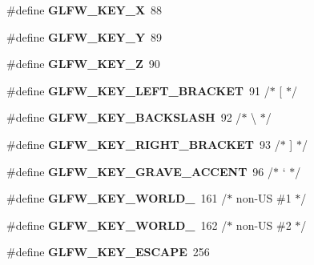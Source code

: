\begin{DoxyCompactItemize}
\#define {\bfseries G\+L\+F\+W\+\_\+\+K\+E\+Y\+\_\+X}~88
\item 
\mbox{\label{group__keys_gafd9f115a549effdf8e372a787c360313}} 
\#define {\bfseries G\+L\+F\+W\+\_\+\+K\+E\+Y\+\_\+Y}~89
\item 
\mbox{\label{group__keys_gac489e208c26afda8d4938ed88718760a}} 
\#define {\bfseries G\+L\+F\+W\+\_\+\+K\+E\+Y\+\_\+Z}~90
\item 
\mbox{\label{group__keys_gad1c8d9adac53925276ecb1d592511d8a}} 
\#define {\bfseries G\+L\+F\+W\+\_\+\+K\+E\+Y\+\_\+\+L\+E\+F\+T\+\_\+\+B\+R\+A\+C\+K\+ET}~91  /$\ast$ \mbox{[} $\ast$/
\item 
\mbox{\label{group__keys_gab8155ea99d1ab27ff56f24f8dc73f8d1}} 
\#define {\bfseries G\+L\+F\+W\+\_\+\+K\+E\+Y\+\_\+\+B\+A\+C\+K\+S\+L\+A\+SH}~92  /$\ast$ \textbackslash{} $\ast$/
\item 
\mbox{\label{group__keys_ga86ef225fd6a66404caae71044cdd58d8}} 
\#define {\bfseries G\+L\+F\+W\+\_\+\+K\+E\+Y\+\_\+\+R\+I\+G\+H\+T\+\_\+\+B\+R\+A\+C\+K\+ET}~93  /$\ast$ \mbox{]} $\ast$/
\item 
\mbox{\label{group__keys_ga7a3701fb4e2a0b136ff4b568c3c8d668}} 
\#define {\bfseries G\+L\+F\+W\+\_\+\+K\+E\+Y\+\_\+\+G\+R\+A\+V\+E\+\_\+\+A\+C\+C\+E\+NT}~96  /$\ast$ ` $\ast$/
\item 
\mbox{\label{group__keys_gadc78dad3dab76bcd4b5c20114052577a}} 
\#define {\bfseries G\+L\+F\+W\+\_\+\+K\+E\+Y\+\_\+\+W\+O\+R\+L\+D\+\_}~161 /$\ast$ non-\/US \#1 $\ast$/
\item 
\mbox{\label{group__keys_ga20494bfebf0bb4fc9503afca18ab2c5e}} 
\#define {\bfseries G\+L\+F\+W\+\_\+\+K\+E\+Y\+\_\+\+W\+O\+R\+L\+D\+\_}~162 /$\ast$ non-\/US \#2 $\ast$/
\item 
\mbox{\label{group__keys_gaac6596c350b635c245113b81c2123b93}} 
\#define {\bfseries G\+L\+F\+W\+\_\+\+K\+E\+Y\+\_\+\+E\+S\+C\+A\+PE}~256
\item 
\mbox{\label{group__keys_ga9555a92ecbecdbc1f3435219c571d667}} 

\end{DoxyCompactItemize}

